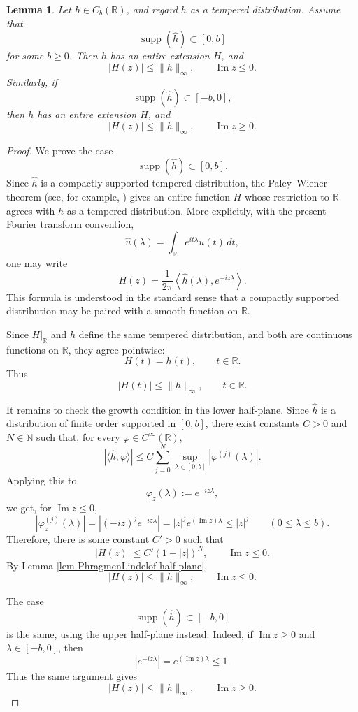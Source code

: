 \documentclass[12pt]{amsart}
\newtheorem{lem}[thm]{Lemma}
\theoremstyle{definition}
\begin{document}
\begin{lem}\label{lem one-sided spec estimate}
Let \(h\in C_b(\mathbb R)\), and regard \(h\) as a tempered distribution. Assume
that
\[
        \operatorname{supp}(\widehat h)\subset [0,b]
\]
for some \(b\ge 0\). Then \(h\) has an entire extension \(H\), and
\[
        |H(z)|\le \|h\|_\infty,
        \qquad \operatorname{Im}z\le 0.
\]
Similarly, if
\[
        \operatorname{supp}(\widehat h)\subset [-b,0],
\]
then \(h\) has an entire extension \(H\), and
\[
        |H(z)|\le \|h\|_\infty,
        \qquad \operatorname{Im}z\ge 0.
\]
\end{lem}
\begin{proof}
We prove the case
\[
        \operatorname{supp}(\widehat h)\subset [0,b].
\]
Since \(\widehat h\) is a compactly supported tempered distribution, the
Paley--Wiener theorem (see, for example, \cite[Theorem 7.3.1]{Hormander03}) gives an entire function \(H\) whose restriction
to \(\mathbb R\) agrees with \(h\) as a tempered distribution. More explicitly,
with the present Fourier transform convention,
\[
        \widehat u(\lambda)
        =
        \int_{\mathbb R}e^{it\lambda}u(t)\,dt,
\]
one may write 
\[
        H(z)
        =
        \frac{1}{2\pi}
        \left\langle \widehat h(\lambda), e^{-iz\lambda}\right\rangle .
\]
This formula is understood in the standard sense that a compactly supported
distribution may be paired with a smooth function on \(\mathbb R\).

Since \(H|_{\mathbb R}\) and \(h\) define the same tempered distribution, and
both are continuous functions on \(\mathbb R\), they agree pointwise:
\[
        H(t)=h(t),
        \qquad t\in\mathbb R.
\]
Thus
\[
        |H(t)|\le \|h\|_\infty,
        \qquad t\in\mathbb R.
\]

It remains to check the growth condition in the lower half-plane. Since
\(\widehat h\) is a distribution of finite order supported in \([0,b]\), there
exist constants \(C>0\) and \(N\in\mathbb N\) such that, for every \(\varphi\in C^{\infty}(\mathbb{R})\),
\[
        \left|\langle \widehat h,\varphi\rangle\right|
        \le
        C\sum_{j=0}^N
        \sup_{\lambda\in[0,b]}
        |\varphi^{(j)}(\lambda)|.
\]
Applying this to
\[
        \varphi_z(\lambda):=e^{-iz\lambda},
\]
we get, for \(\operatorname{Im}z\le 0\),
\[
        |\varphi_z^{(j)}(\lambda)|
        =
        |(-iz)^j e^{-iz\lambda}|
        =
        |z|^j e^{(\operatorname{Im}z)\lambda}
        \le
        |z|^j
        \qquad (0\le \lambda\le b).
\]
Therefore, there is some constant \(C'>0\) such that 
\[
        |H(z)|
        \le
        C'(1+|z|)^N,
        \qquad \operatorname{Im}z\le 0.
\]
By Lemma \ref{lem PhragmenLindelof half plane},
\[
        |H(z)|\le \|h\|_\infty,
        \qquad \operatorname{Im}z\le 0.
\]

The case
\[
        \operatorname{supp}(\widehat h)\subset [-b,0]
\]
is the same, using the upper half-plane instead. Indeed, if
\(\operatorname{Im}z\ge 0\) and \(\lambda\in[-b,0]\), then
\[
        |e^{-iz\lambda}|
        =
        e^{(\operatorname{Im}z)\lambda}
        \le 1.
\]
Thus the same argument gives
\[
        |H(z)|\le \|h\|_\infty,
        \qquad \operatorname{Im}z\ge 0.
\]
\end{proof}
\end{document}

